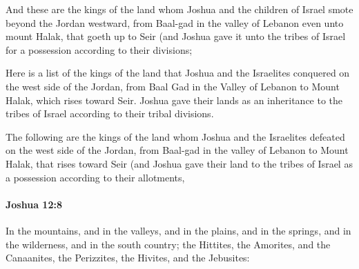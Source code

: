 			\begin{versebox}
					\item[BHS] 
					\item[ASV] And these are the kings of the land whom Joshua and the children of Israel smote beyond the Jordan westward, from Baal-gad in the valley of Lebanon even unto mount Halak, that goeth up to Seir (and Joshua gave it unto the tribes of Israel for a possession according to their divisions;
					\item[NIV] Here is a list of the kings of the land that Joshua and the Israelites conquered on the west side of the Jordan, from Baal Gad in the Valley of Lebanon to Mount Halak, which rises toward Seir. Joshua gave their lands as an inheritance to the tribes of Israel according to their tribal divisions.
					\item[NRSV] The following are the kings of the land whom Joshua and the Israelites defeated on the west side of the Jordan, from Baal-gad in the valley of Lebanon to Mount Halak, that rises toward Seir (and Joshua gave their land to the tribes of Israel as a possession according to their allotments,
			\end{versebox}

		\paragraph{Joshua 12:8} %
			\label{JOSHUA-12-8}

			In the mountains, and in the valleys, and in the plains, and in the springs, and in the wilderness, and in the south country; the Hittites, the Amorites, and the Canaanites, the Perizzites, the Hivites, and the Jebusites:

